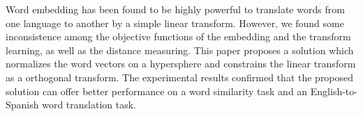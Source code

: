 Word embedding has been found to be highly powerful to translate words from one language to another by a simple linear transform. However, we found some inconsistence among the objective functions of the embedding and the transform learning, as well as the distance measuring. This paper proposes a solution which normalizes the word vectors on a hypersphere and constrains the linear transform as a orthogonal transform. The experimental results  confirmed that the proposed solution can offer better performance on a word similarity task and an English-to-Spanish word translation task.
